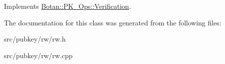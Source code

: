 Implements \hyperlink{classBotan_1_1PK__Ops_1_1Verification_af66d51b7b6ae5e9b851815df23f7db7c}{Botan\-::\-P\-K\-\_\-\-Ops\-::\-Verification}.



The documentation for this class was generated from the following files\-:\begin{DoxyCompactItemize}
\item 
src/pubkey/rw/rw.\-h\item 
src/pubkey/rw/rw.\-cpp\end{DoxyCompactItemize}

